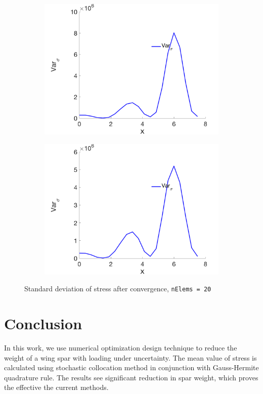 \documentclass[a4paper]{article}
\begin{document}
\begin{figure} [H]
\begin{subfigure}{0.45\textwidth}
    \includegraphics[width=1.0\linewidth]{p3n20_deviation.png}
    \label{fig:deviation_p3}
  \end{subfigure}
  \begin{subfigure}{0.45\textwidth}
    \centering
    \includegraphics[width=1.0\linewidth]{p4n20_deviation.png}
    \label{fig:deviation_p4}
  \end{subfigure}  
  \caption{Standard deviation of stress after convergence, \texttt{nElems = 20} \label{fig:deviation}}
\end{figure}

\section{Conclusion}
In this work, we use numerical optimization design technique to reduce the weight of a wing spar with loading under uncertainty. The mean value of stress is calculated using stochastic collocation method in conjunction with Gauss-Hermite quadrature rule. The results see significant reduction in spar weight, which proves the effective the current methods.
\end{document}
